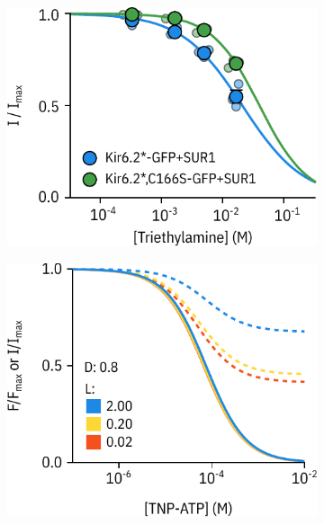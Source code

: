 \begin{figure}[h]
\begin{subfigure}[t]{0.45\textwidth}
	\end{subfigure}
	\vfill
	\begin{subfigure}[t]{0.45\textwidth}
		\caption{}\label{ch5fig:tea_drc}
		\centering
		\includegraphics[width=\textwidth]{tea_drc.pdf}
	\end{subfigure}
	\hfill
	\begin{subfigure}[t]{0.45\textwidth}
		\caption{}\label{ch5fig:l_d_sim}
		\centering
		\includegraphics[width=\textwidth]{c166s_param_sim_1.pdf}
	\end{subfigure}
	\caption[C166S alters transduction of nucleotide binding to Kir6.2]{
	}\label{ch5fig:c166s_3}
\end{figure}

